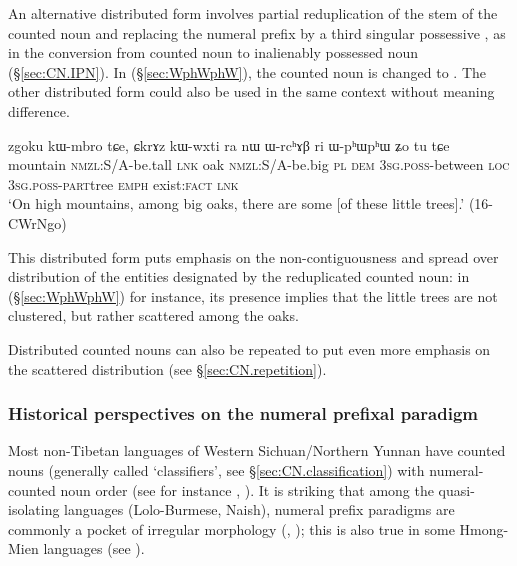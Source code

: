 An alternative distributed form involves partial reduplication of the stem of the counted noun and replacing the numeral prefix by a third singular possessive , as in the conversion from counted noun to inalienably possessed noun (§\ref{sec:CN.IPN}). In (§\ref{sec:WphWphW}), the counted noun  is changed to . The other distributed form  could also be used in the same context without meaning difference. 

\begin{exe}
\ex \label{sec:WphWphW}
\gll zgoku kɯ-mbro tɕe, ɕkrɤz kɯ-wxti ra nɯ ɯ-rcʰɤβ ri ɯ-pʰɯ\redp{}pʰɯ ʑo tu tɕe \\
mountain \textsc{nmzl}:S/A-be.tall \textsc{lnk} oak \textsc{nmzl}:S/A-be.big \textsc{pl} \textsc{dem} \textsc{3sg}.\textsc{poss}-between \textsc{loc} \textsc{3sg}.\textsc{poss}-\textsc{part}\redp{}tree \textsc{emph} exist:\textsc{fact} \textsc{lnk} \\
\glt `On high mountains, among big oaks, there are some [of these little trees].' (16-CWrNgo)
\end{exe}   

This distributed form puts emphasis on the non-contiguousness and spread over distribution of the entities designated by the reduplicated counted noun: in (§\ref{sec:WphWphW}) for instance, its presence implies that the little trees are not clustered, but rather scattered among the oaks.

Distributed counted nouns can also be repeated to put even more emphasis on the scattered distribution (see §\ref{sec:CN.repetition}).

\subsubsection{Historical perspectives on the numeral prefixal paradigm} \label{sec:num.prefix.paradigm.history}
Most non-Tibetan languages of Western Sichuan/Northern Yunnan have counted nouns (generally called `classifiers', see §\ref{sec:CN.classification}) with numeral-counted noun order (see for instance \citealt{zhang14classifiers}, \citealt[163--194]{michaud17yongning}).  It is striking that among the quasi-isolating languages (Lolo-Burmese, Naish), numeral prefix paradigms are commonly a pocket of irregular morphology (\citealt{bradley05numerals}, \citealt{michaud11cl}); this is also true in some Hmong-Mien  languages (see \citealt{gerner10classifier.isolating}).


